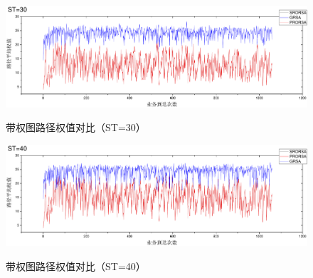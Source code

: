 \begin{figure}
\setlength{\belowcaptionskip}{-0.5cm}
\begin{center}
{\includegraphics[width=1 \textwidth]{figures/H30C.pdf}}
\end{center}
\caption{{\footnotesize{带权图路径权值对比（ST=30）}}}
\label{H30C}
\end{figure}
\begin{figure}
\setlength{\belowcaptionskip}{-0.5cm}
\begin{center}
{\includegraphics[width=1 \textwidth]{figures/H40C.pdf}}
\end{center}
\caption{{\footnotesize{带权图路径权值对比（ST=40）}}}
\label{H40C}
\end{figure}

